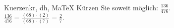 \begin{MAufgabe}{Kuerzen}{kr, dh, MaTeX}
K\"urzen Sie soweit m\"oglich: $\frac{136}{476}$.\\ 
\ifLsg\MLoesung
\quad $\frac{136}{476}=\frac{(68)\cdot(2)}{(68)\cdot(7)}=\frac{2}{7}$.\else\relax\fi
 \end{MAufgabe}